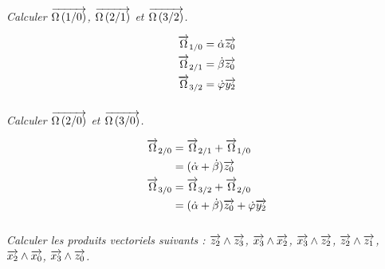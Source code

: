 \documentclass[10pt,fleqn]{article} %
\begin{document}
\begin{multicols}{2}
\begin{corrige}

\end{corrige}\else\fi

\subparagraph{}
\textit{Calculer $\overrightarrow{\Omega\left( {1}/{0}\right)}$, $\overrightarrow{\Omega\left( {2}/{1}\right)}$ et $\overrightarrow{\Omega\left( {3}/{2}\right)}$.}
\ifprof
\begin{corrige}
\begin{align*}
\overrightarrow{\Omega}_{1 / 0}&=\dot\alpha\overrightarrow{z_0}\\
\overrightarrow{\Omega}_{2 / 1}&=\dot\beta\overrightarrow{z_0}\\
\overrightarrow{\Omega}_{3 / 2}&=\dot\varphi\overrightarrow{y_2}\\
\end{align*}
\end{corrige}\else\fi



\subparagraph{}
\textit{Calculer $\overrightarrow{\Omega\left( {2}/{0}\right)}$ et $\overrightarrow{\Omega\left( {3}/{0}\right)}$.}
\ifprof
\begin{corrige}
\begin{align*}
\overrightarrow{\Omega}_{2 / 0}&=\overrightarrow{\Omega}_{2 / 1}+\overrightarrow{\Omega}_{1 / 0}\\
	&=(\dot\alpha+\dot\beta)\overrightarrow{z_0}\\
\overrightarrow{\Omega}_{3 / 0}&=\overrightarrow{\Omega}_{3 / 2}+\overrightarrow{\Omega}_{2 / 0}\\
	&=(\dot\alpha+\dot\beta)\overrightarrow{z_0}+\dot\varphi\overrightarrow{y_2}
\end{align*}

\end{corrige}\else\fi

\subparagraph{}
\textit{Calculer les produits vectoriels suivants : $\overrightarrow{z_2}\wedge\overrightarrow{z_3}$,
$\overrightarrow{x_3}\wedge\overrightarrow{x_2}$, $\overrightarrow{x_3}\wedge\overrightarrow{z_2}$,
$\overrightarrow{z_2}\wedge\overrightarrow{z_1}$, $\overrightarrow{x_2}\wedge\overrightarrow{x_0}$,
$\overrightarrow{x_3}\wedge\overrightarrow{z_0}$.}
\ifprof
\begin{corrige}


\end{corrige}
\end{multicols}
\end{document}
